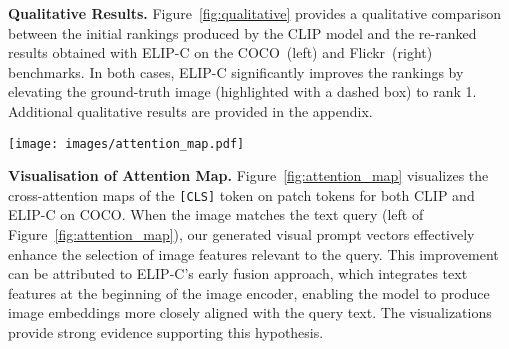 \vspace{2pt}
\noindent \textbf{Qualitative Results.}
Figure~\ref{fig:qualitative} provides a qualitative comparison between the initial rankings produced by the CLIP model and the re-ranked results obtained with ELIP-C on the COCO~(left) and Flickr~(right) benchmarks. In both cases, ELIP-C significantly improves the rankings by elevating the ground-truth image (highlighted with a dashed box) to rank 1. Additional qualitative results are provided in the appendix.


\begin{figure*}[h]
\centering
\texttt{[image: images/attention\_map.pdf]}
\vspace{-2pt}
\caption{
\textbf{Visualisation of attention maps} comparing the cross-attention maps of the \texttt{[CLS]} token on patch tokens for CLIP and ELIP-C. Left: image matches the text query; Right: image does not match the text query. For matched queries, ELIP-C enhances attention on image features relevant to the text. 
For example: (Row 1) ELIP-C focuses more on the giant tennis racket and the young woman for the query ``A young woman holding a giant tennis racket''; 
(Row 2) ELIP-C highlights the cake, baby, and shirt for the query ``A baby in plaid shirt eating a frosted cake''.
Differences are minimal when the image does not match the query (Columns 4–6). 
} 
\label{fig:attention_map}
\end{figure*}



\vspace{2pt} \noindent \textbf{Visualisation of Attention Map.} 
Figure~\ref{fig:attention_map} visualizes the cross-attention maps of the \texttt{[CLS]} token on patch tokens for both CLIP and ELIP-C on COCO. When the image matches the text query (left of Figure~\ref{fig:attention_map}), our generated visual prompt vectors effectively enhance the selection of image features relevant to the query. This improvement can be attributed to ELIP-C's early fusion approach, which integrates text features at the beginning of the image encoder, enabling the model to produce image embeddings more closely aligned with the query text. The visualizations provide strong evidence supporting this hypothesis.

